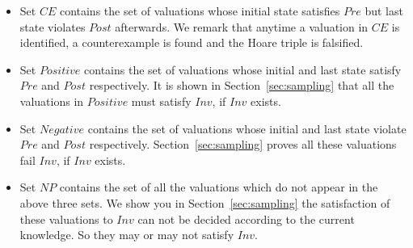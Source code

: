 \begin{itemize}
    \item Set $\mathit{CE}$ contains the set of valuations whose initial state satisfies $\mathit{Pre}$ but last state violates $\mathit{Post}$ afterwards. We remark that anytime a valuation in $\mathit{CE}$ is identified, a counterexample is found and the Hoare triple is falsified.
    \item Set $\mathit{Positive}$ contains the set of valuations whose initial and last state satisfy $\mathit{Pre}$ and $Post$ respectively. It is shown in Section~\ref{sec:sampling} that all the valuations in $\mathit{Positive}$ must satisfy $\mathit{Inv}$, if $\mathit{Inv}$ exists.
    \item Set $\mathit{Negative}$ contains the set of valuations whose initial and last state violate $\mathit{Pre}$ and $\mathit{Post}$ respectively. Section~\ref{sec:sampling} proves all these valuations fail $\mathit{Inv}$, if $\mathit{Inv}$ exists.
    \item Set $\mathit{NP}$ contains the set of all the valuations which do not appear in the above three sets. We show you in Section~\ref{sec:sampling} the satisfaction of these valuations to $\mathit{Inv}$ can not be decided according to the current knowledge. So they may or may not satisfy $\mathit{Inv}$.
\end{itemize}
